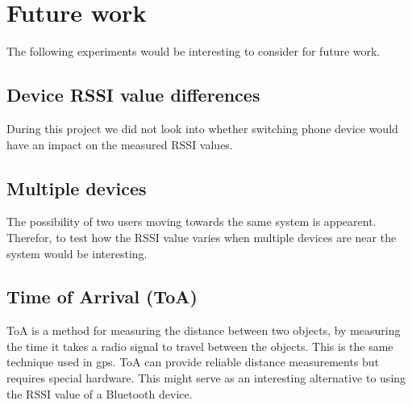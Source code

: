 \section{Future work}
The following experiments would be interesting to consider for future work.


\subsection{Device RSSI value differences}

During this project we did not look into whether switching phone device would have an impact on the measured RSSI values.


\subsection{Multiple devices}

The possibility of two users moving towards the same system is appearent. Therefor, to test how the RSSI value varies when multiple devices are near the system would be interesting.


\subsection{Time of Arrival (ToA)}
ToA is a method for measuring the distance between two objects, by measuring the time it takes a radio signal to travel between the objects. This is the same technique used in gps. ToA can provide reliable distance measurements but requires special hardware. This might serve as an interesting alternative to using the RSSI value of a Bluetooth device.
